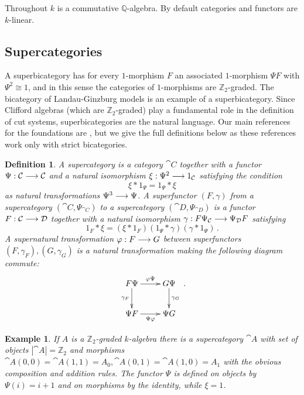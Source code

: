 \documentclass[english,letter paper,12pt,leqno]{article}
\theoremstyle{example}
\newtheorem{definition}[theorem]{Definition}
\newtheorem{example}[theorem]{Example}
\numberwithin{equation}{section}
\begin{document}
Throughout $k$ is a commutative $\mathbb{Q}$-algebra. By default categories and functors are $k$-linear.

\subsection{Supercategories}

A superbicategory has for every $1$-morphism $F$ an associated $1$-morphism $\Psi F$ with $\Psi^2 \cong 1$, and in this sense the categories of $1$-morphisms are $\mathbb{Z}_2$-graded. The bicategory of Landau-Ginzburg models is an example of a superbicategory. Since Clifford algebras (which are $\mathbb{Z}_2$-graded) play a fundamental role in the definition of cut systems, superbicategories are the natural language. Our main references for the foundations are \cite{ellis_lauda,kang,kang2}, but we give the full definitions below as these references work only with strict bicategories.

\begin{definition} A \emph{supercategory} is a category $\cat{C}$ together with a functor $\Psi: \mathcal{C} \longrightarrow \mathcal{C}$ and a natural isomorphism $\xi: \Psi^2 \longrightarrow 1_{\mathcal{C}}$ satisfying the condition
\[
\xi * 1_{\Psi} = 1_{\Psi} * \xi
\]
as natural transformations $\Psi^3 \longrightarrow \Psi$. A \emph{superfunctor} $(F, \gamma)$ from a supercategory $(\cat{C}, \Psi_{\cat{C}})$ to a supercategory $(\cat{D}, \Psi_{\cat{D}})$ is a functor $F: \mathcal{C} \longrightarrow \mathcal{D}$ together with a natural isomorphism $\gamma: F \Psi_{\mathcal{C}} \longrightarrow \Psi_{\mathcal{D}} F$ satisfying
\[
1_F * \xi = (\xi * 1_F ) ( 1_{\Psi} * \gamma ) ( \gamma * 1_{\Psi} )\,.
\]
A \emph{supernatural transformation} $\varphi: F \longrightarrow G$ between superfunctors $(F,\gamma_F), (G,\gamma_G)$ is a natural transformation making the following diagram commute:
\[
\xymatrix{
F \Psi \ar[r]^-{\varphi \Psi}\ar[d]_-{\gamma_F} & G \Psi \ar[d]^-{\gamma_G}\\
\Psi F \ar[r]_-{\Psi \varphi} & \Psi G
}\,.
\] 
\end{definition}

\begin{example}\label{example:Aassup} If $A$ is a $\mathbb{Z}_2$-graded $k$-algebra there is a supercategory $\cat{A}$ with set of objects $|\cat{A}| = \mathbb{Z}_2$ and morphisms $\cat{A}(0,0) = \cat{A}(1,1) = A_0, \cat{A}(0,1) = \cat{A}(1,0) = A_1$ with the obvious composition and addition rules. The functor $\Psi$ is defined on objects by $\Psi(i) = i+1$ and on morphisms by the identity, while $\xi = 1$.
\end{example}
\end{document}
